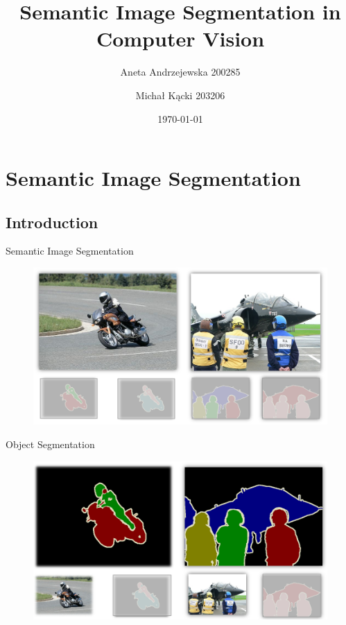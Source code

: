 \documentclass[12]{beamer}
\title[Semantic Image Segmentation in Computer Vision]
{Semantic Image Segmentation in Computer Vision}
\author{Aneta Andrzejewska 200285 \and Michał Kącki 203206}
\date[EngThesisPresentation]{\today}
\begin{document}
\begin{frame}
  \titlepage
\end{frame}



\section{Semantic Image Segmentation}

\subsection{Introduction}

\begin{frame}{Semantic Image Segmentation}

\begin{figure}
\includegraphics[width=\textwidth]{segmentation}
\end{figure}

\end{frame}

\begin{frame}{Object Segmentation}

\begin{figure}
\includegraphics[width=\textwidth]{segmentation_object}
\end{figure}

\end{frame}
\end{document}
